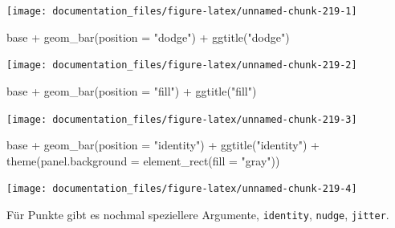\documentclass[
]{article}
\newenvironment{Shaded}{\begin{snugshade}}{\end{snugshade}}
\newcommand{\AttributeTok}[1]{\textcolor[rgb]{0.77,0.63,0.00}{#1}}
\newcommand{\FunctionTok}[1]{\textcolor[rgb]{0.00,0.00,0.00}{#1}}
\newcommand{\NormalTok}[1]{#1}
\newcommand{\SpecialCharTok}[1]{\textcolor[rgb]{0.00,0.00,0.00}{#1}}
\newcommand{\StringTok}[1]{\textcolor[rgb]{0.31,0.60,0.02}{#1}}
\begin{document}
\begin{center}\texttt{[image: documentation\_files/figure-latex/unnamed-chunk-219-1]} \end{center}

\begin{Shaded}
\begin{Highlighting}[]
\NormalTok{base }\SpecialCharTok{+} \FunctionTok{geom\_bar}\NormalTok{(}\AttributeTok{position =} \StringTok{"dodge"}\NormalTok{) }\SpecialCharTok{+} \FunctionTok{ggtitle}\NormalTok{(}\StringTok{"dodge"}\NormalTok{)}
\end{Highlighting}
\end{Shaded}

\begin{center}\texttt{[image: documentation\_files/figure-latex/unnamed-chunk-219-2]} \end{center}

\begin{Shaded}
\begin{Highlighting}[]
\NormalTok{base }\SpecialCharTok{+} \FunctionTok{geom\_bar}\NormalTok{(}\AttributeTok{position =} \StringTok{"fill"}\NormalTok{) }\SpecialCharTok{+} \FunctionTok{ggtitle}\NormalTok{(}\StringTok{"fill"}\NormalTok{)}
\end{Highlighting}
\end{Shaded}

\begin{center}\texttt{[image: documentation\_files/figure-latex/unnamed-chunk-219-3]} \end{center}

\begin{Shaded}
\begin{Highlighting}[]
\NormalTok{base }\SpecialCharTok{+} \FunctionTok{geom\_bar}\NormalTok{(}\AttributeTok{position =} \StringTok{"identity"}\NormalTok{) }\SpecialCharTok{+} \FunctionTok{ggtitle}\NormalTok{(}\StringTok{"identity"}\NormalTok{) }\SpecialCharTok{+}
  \FunctionTok{theme}\NormalTok{(}\AttributeTok{panel.background =} \FunctionTok{element\_rect}\NormalTok{(}\AttributeTok{fill =} \StringTok{"gray"}\NormalTok{))}
\end{Highlighting}
\end{Shaded}

\begin{center}\texttt{[image: documentation\_files/figure-latex/unnamed-chunk-219-4]} \end{center}

Für Punkte gibt es nochmal speziellere Argumente, \texttt{identity}, \texttt{nudge}, \texttt{jitter}.
\end{document}
